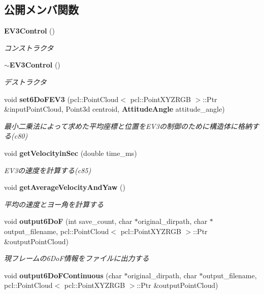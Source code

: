 \subsection*{公開メンバ関数}
\begin{DoxyCompactItemize}
\item 
{\bf E\-V3\-Control} ()
\begin{DoxyCompactList}\small\item\em コンストラクタ \end{DoxyCompactList}\item 
{\bf $\sim$\-E\-V3\-Control} ()
\begin{DoxyCompactList}\small\item\em デストラクタ \end{DoxyCompactList}\item 
void {\bf set6\-Do\-F\-E\-V3} (pcl\-::\-Point\-Cloud$<$ pcl\-::\-Point\-X\-Y\-Z\-R\-G\-B $>$\-::Ptr \&input\-Point\-Cloud, Point3d centroid, {\bf Attitude\-Angle} attitude\-\_\-angle)
\begin{DoxyCompactList}\small\item\em 最小二乗法によって求めた平均座標と位置を\-E\-V3の制御のために構造体に格納する(c80) \end{DoxyCompactList}\item 
void {\bf get\-Velocityin\-Sec} (double time\-\_\-ms)
\begin{DoxyCompactList}\small\item\em E\-V3の速度を計算する(c85) \end{DoxyCompactList}\item 
void {\bf get\-Average\-Velocity\-And\-Yaw} ()
\begin{DoxyCompactList}\small\item\em 平均の速度とヨー角を計算する \end{DoxyCompactList}\item 
void {\bf output6\-Do\-F} (int save\-\_\-count, char $\ast$original\-\_\-dirpath, char $\ast$output\-\_\-filename, pcl\-::\-Point\-Cloud$<$ pcl\-::\-Point\-X\-Y\-Z\-R\-G\-B $>$\-::Ptr \&output\-Point\-Cloud)
\begin{DoxyCompactList}\small\item\em 現フレームの6\-Do\-F情報をファイルに出力する \end{DoxyCompactList}\item 
void {\bf output6\-Do\-F\-Continuous} (char $\ast$original\-\_\-dirpath, char $\ast$output\-\_\-filename, pcl\-::\-Point\-Cloud$<$ pcl\-::\-Point\-X\-Y\-Z\-R\-G\-B $>$\-::Ptr \&output\-Point\-Cloud)

\end{DoxyCompactItemize}
